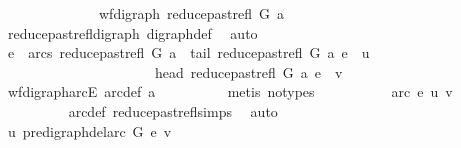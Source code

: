 \begin{isabellebody}
\ \ \ \ \isamarkupfalse%
\ {\isacharminus}{\kern0pt}\isanewline
\ \ \ \ \ \ \isamarkupfalse%
\ {\isachardoublequoteopen}wf{\isacharunderscore}{\kern0pt}digraph\ {\isacharparenleft}{\kern0pt}reduce{\isacharunderscore}{\kern0pt}past{\isacharunderscore}{\kern0pt}refl\ G\ a{\isacharparenright}{\kern0pt}{\isachardoublequoteclose}\isanewline
\ \ \ \ \ \ \ \ \isamarkupfalse%
\ reduce{\isacharunderscore}{\kern0pt}past{\isacharunderscore}{\kern0pt}refl{\isacharunderscore}{\kern0pt}digraph\ digraph{\isacharunderscore}{\kern0pt}def\ \isamarkupfalse%
\ auto\isanewline
\ \ \ \ \ \ \isamarkupfalse%
\ \isamarkupfalse%
\ {\isachardoublequoteopen}e\ {\isasymin}\ arcs\ {\isacharparenleft}{\kern0pt}reduce{\isacharunderscore}{\kern0pt}past{\isacharunderscore}{\kern0pt}refl\ G\ a{\isacharparenright}{\kern0pt}\ {\isasymand}\ tail\ {\isacharparenleft}{\kern0pt}reduce{\isacharunderscore}{\kern0pt}past{\isacharunderscore}{\kern0pt}refl\ G\ a{\isacharparenright}{\kern0pt}\ e\ {\isacharequal}{\kern0pt}\ u\isanewline
\ \ \ \ \ \ \ \ \ \ \ \ \ \ \ \ \ \ \ \ \ {\isasymand}\ head\ {\isacharparenleft}{\kern0pt}reduce{\isacharunderscore}{\kern0pt}past{\isacharunderscore}{\kern0pt}refl\ G\ a{\isacharparenright}{\kern0pt}\ e\ {\isacharequal}{\kern0pt}\ v{\isachardoublequoteclose}\isanewline
\ \ \ \ \ \ \ \ \isamarkupfalse%
\ wf{\isacharunderscore}{\kern0pt}digraph{\isachardot}{\kern0pt}arcE\ arc{\isacharunderscore}{\kern0pt}def\ a\isanewline
\ \ \ \ \ \ \ \ \isamarkupfalse%
\ {\isacharparenleft}{\kern0pt}metis\ {\isacharparenleft}{\kern0pt}no{\isacharunderscore}{\kern0pt}types{\isacharparenright}{\kern0pt}{\isacharparenright}{\kern0pt}\ \isanewline
\ \ \ \ \ \ \isamarkupfalse%
\ \isamarkupfalse%
\ {\isachardoublequoteopen}arc\ e\ {\isacharparenleft}{\kern0pt}u{\isacharcomma}{\kern0pt}\ v{\isacharparenright}{\kern0pt}{\isachardoublequoteclose}\isanewline
\ \ \ \ \ \ \ \ \isamarkupfalse%
\ arc{\isacharunderscore}{\kern0pt}def\ reduce{\isacharunderscore}{\kern0pt}past{\isacharunderscore}{\kern0pt}refl{\isachardot}{\kern0pt}simps\ \isamarkupfalse%
\ auto\isanewline
\ \ \ \ \isamarkupfalse%
\isanewline
\ \ \ \ \isamarkupfalse%
\ {\isachardoublequoteopen}u\ {\isasymrightarrow}\isactrlsup {\isacharplus}{\kern0pt}\isactrlbsub pre{\isacharunderscore}{\kern0pt}digraph{\isachardot}{\kern0pt}del{\isacharunderscore}{\kern0pt}arc\ G\ e\isactrlesub \ v{\isachardoublequoteclose}\isanewline

\end{isabellebody}
